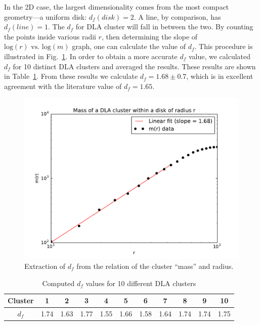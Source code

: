 \documentclass[aps,prl,preprint,superscriptaddress]{revtex4}
\begin{document}
In the 2D case, the largest dimensionality comes from the most compact geometry---a uniform disk: $d_f(disk) = 2$. A line, by comparison, has $d_f(line) = 1$. The $d_f$ for DLA cluster will fall in between the two. By counting the points inside various radii $r$, then determining the slope of $\text{log}(r)\text{ vs. }\text{log}(m)$ graph, one can calculate the value of $d_f$. This procedure is illustrated in Fig.~\ref{df}. In order to obtain a more accurate $d_f$ value, we calculated $d_f$ for 10 distinct DLA clusters and averaged the results. These results are shown in Table~\ref{df_table}. From these results we calculate $d_f =1.68\pm 0.7$, which is in excellent agreement with the literature value of $d_f = 1.65$.
\begin{figure}[H]
	\centering
	\includegraphics[width=1.0\textwidth]{mass_vs_R.pdf}
	\caption{Extraction of $d_f$ from the relation of the cluster ``mass'' and radius.}
	\label{df}
\end{figure}

\begin{table}[H]
\caption{Computed $d_f$ values for 10 different DLA clusters}
\label{df_table}
\begin{center}
\begin{tabular}{ |c|c|c|c|c|c|c|c|c|c|c| } 
 \hline
Cluster & 1 & 2 & 3 & 4 & 5 & 6 & 7 & 8 & 9 & 10 \\ 
\hline
 $d_f$& 1.74 & 1.63 & 1.77 & 1.55 & 1.66 & 1.58 & 1.64 & 1.74 & 1.74 & 1.75 \\ 
 \hline
\end{tabular}
\end{center}
\end{table}
 
	
\end{document}
